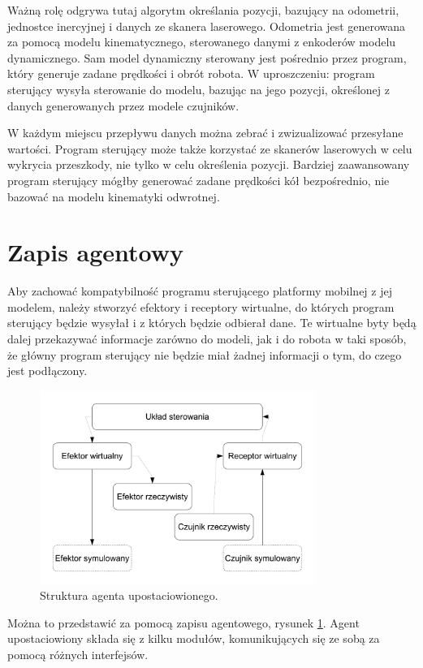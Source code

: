 Ważną rolę odgrywa tutaj algorytm określania pozycji, bazujący na odometrii, jednostce inercyjnej i danych ze skanera laserowego.
Odometria jest generowana za pomocą modelu kinematycznego, sterowanego danymi z enkoderów modelu dynamicznego.
Sam model dynamiczny sterowany jest pośrednio przez program, który generuje zadane prędkości i obrót robota.
W uproszczeniu: program sterujący wysyła sterowanie do modelu, bazując na jego pozycji, określonej z danych generowanych przez modele czujników.

W każdym miejscu przepływu danych można zebrać i zwizualizować przesyłane wartości.
Program sterujący może także korzystać ze skanerów laserowych w celu wykrycia przeszkody, nie tylko w celu określenia pozycji.
Bardziej zaawansowany program sterujący mógłby generować zadane prędkości kół bezpośrednio, nie bazować na modelu kinematyki odwrotnej.

\section{Zapis agentowy}
	Aby zachować kompatybilność programu sterującego platformy mobilnej z jej modelem, należy stworzyć efektory i receptory wirtualne, do których 
	program sterujący będzie wysyłał i z których będzie odbierał dane. 
	Te wirtualne byty będą dalej przekazywać informacje zarówno do modeli, jak i do robota w taki sposób, że
	główny program sterujący nie będzie miał żadnej informacji o tym, do czego jest podłączony. 
	
	\begin{figure}[H]
		\centering
		\includegraphics[width=0.8\textwidth]{graphics/agent.pdf}
		\caption{Struktura agenta upostaciowionego.}
		\label{fig:agent}
	\end{figure} 

	Można to przedstawić za pomocą zapisu agentowego, rysunek \ref{fig:agent}.
	Agent upostaciowiony składa się z kilku modułów, komunikujących się ze sobą za pomocą różnych interfejsów.

